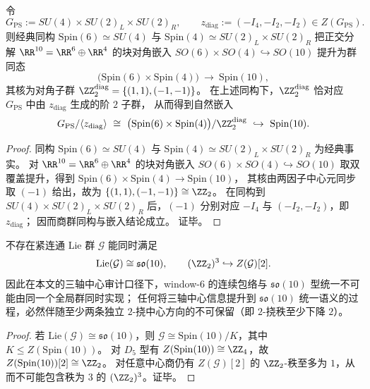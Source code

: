 \begin{corollary}\label{cor:bdry-patisalam-spin10-kernel}
令
\[
G_{\mathrm{PS}}:=SU(4)\times SU(2)_L\times SU(2)_R,
\qquad
z_{\mathrm{diag}}:=(-I_4,-I_2,-I_2)\in Z(G_{\mathrm{PS}}).
\]
则经典同构
\(
\mathrm{Spin}(6)\simeq SU(4)
\)
与
\(
\mathrm{Spin}(4)\simeq SU(2)_L\times SU(2)_R
\)
把正交分解 \(\RR^{10}=\RR^6\oplus \RR^4\) 的块对角嵌入
\(
SO(6)\times SO(4)\hookrightarrow SO(10)
\)
提升为群同态
\[
\bigl(\mathrm{Spin}(6)\times \mathrm{Spin}(4)\bigr)\ \longrightarrow\ \mathrm{Spin}(10),
\]
其核为对角子群 \(\ZZ_2^{\mathrm{diag}}=\{(1,1),(-1,-1)\}\)。
在上述同构下，\(\ZZ_2^{\mathrm{diag}}\) 恰对应 \(G_{\mathrm{PS}}\) 中由 \(z_{\mathrm{diag}}\) 生成的阶 \(2\) 子群，
从而得到自然嵌入
\[
G_{\mathrm{PS}}/\langle z_{\mathrm{diag}}\rangle
\ \cong\
\bigl(\mathrm{Spin}(6)\times \mathrm{Spin}(4)\bigr)/\ZZ_2^{\mathrm{diag}}
\ \hookrightarrow\
\mathrm{Spin}(10).
\]
\end{corollary}
\begin{proof}
同构 \(\mathrm{Spin}(6)\simeq SU(4)\) 与 \(\mathrm{Spin}(4)\simeq SU(2)_L\times SU(2)_R\) 为经典事实。
对 \(\RR^{10}=\RR^6\oplus\RR^4\) 的块对角嵌入 \(SO(6)\times SO(4)\hookrightarrow SO(10)\) 取双覆盖提升，得到
\(\mathrm{Spin}(6)\times \mathrm{Spin}(4)\to \mathrm{Spin}(10)\)，
其核由两因子中心元同步取 \((-1)\) 给出，故为 \(\{(1,1),(-1,-1)\}\cong\ZZ_2\)。
在同构到 \(SU(4)\times SU(2)_L\times SU(2)_R\) 后，\((-1)\) 分别对应 \(-I_4\) 与 \((-I_2,-I_2)\)，即 \(z_{\mathrm{diag}}\)；
因而商群同构与嵌入结论成立。
证毕。
\end{proof}

\begin{theorem}\label{thm:so10-2torsion-central-collapse-necessity}
不存在紧连通 Lie 群 \(\mathcal G\) 能同时满足
\[
\mathrm{Lie}(\mathcal G)\cong \mathfrak{so}(10),
\qquad
(\ZZ_2)^3\hookrightarrow Z(\mathcal G)[2].
\]
因此在本文的三轴中心审计口径下，window-\(6\) 的连续包络与 \(\mathfrak{so}(10)\) 型统一不可能由同一个全局群同时实现；
任何将三轴中心信息提升到 \(\mathfrak{so}(10)\) 统一语义的过程，必然伴随至少两条独立 \(2\)-挠中心方向的不可保留（即 \(2\)-挠秩至少下降 \(2\)）。
\end{theorem}
\begin{proof}
若 \(\mathrm{Lie}(\mathcal G)\cong\mathfrak{so}(10)\)，则 \(\mathcal G\cong \mathrm{Spin}(10)/K\)，其中 \(K\le Z(\mathrm{Spin}(10))\)。
对 \(D_5\) 型有 \(Z(\mathrm{Spin}(10))\cong \ZZ_4\)，故 \(Z(\mathrm{Spin}(10))[2]\cong \ZZ_2\)。
对任意中心商仍有 \(Z(\mathcal G)[2]\) 的 \(\ZZ_2\)-秩至多为 \(1\)，从而不可能包含秩为 \(3\) 的 \((\ZZ_2)^3\)。证毕。
\end{proof}

